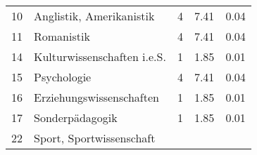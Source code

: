 \begin{longtable}{lXrrr}
     10 &
     \multicolumn{1}{X}{ Anglistik, Amerikanistik   } &


       \num{4} &
       \num[round-mode=places,round-precision=2]{7,41} &
         \num[round-mode=places,round-precision=2]{0,04} \\

     11 &
     \multicolumn{1}{X}{ Romanistik   } &


       \num{4} &
       \num[round-mode=places,round-precision=2]{7,41} &
         \num[round-mode=places,round-precision=2]{0,04} \\

     14 &
     \multicolumn{1}{X}{ Kulturwissenschaften i.e.S.   } &


       \num{1} &
       \num[round-mode=places,round-precision=2]{1,85} &
         \num[round-mode=places,round-precision=2]{0,01} \\

     15 &
     \multicolumn{1}{X}{ Psychologie   } &


       \num{4} &
       \num[round-mode=places,round-precision=2]{7,41} &
         \num[round-mode=places,round-precision=2]{0,04} \\

     16 &
     \multicolumn{1}{X}{ Erziehungswissenschaften   } &


       \num{1} &
       \num[round-mode=places,round-precision=2]{1,85} &
         \num[round-mode=places,round-precision=2]{0,01} \\

     17 &
     \multicolumn{1}{X}{ Sonderpädagogik   } &


       \num{1} &
       \num[round-mode=places,round-precision=2]{1,85} &
         \num[round-mode=places,round-precision=2]{0,01} \\

     22 &
     \multicolumn{1}{X}{ Sport, Sportwissenschaft   } &



\end{longtable}
